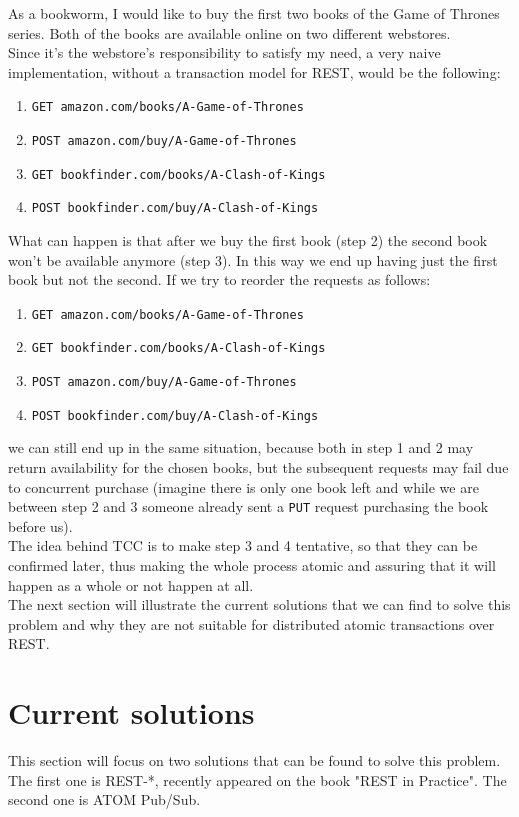 As a bookworm, I would like to buy the first two books of the Game of Thrones series. Both of the books are available online on two different webstores.\\
Since it's the webstore's responsibility to satisfy my need, a very naive implementation, without a transaction model for REST, would be the following:\\
\begin{enumerate}
\item {\tt GET amazon.com/books/A-Game-of-Thrones}
\item {\tt POST amazon.com/buy/A-Game-of-Thrones}
\item {\tt GET bookfinder.com/books/A-Clash-of-Kings}
\item {\tt POST bookfinder.com/buy/A-Clash-of-Kings}
\end{enumerate}
What can happen is that after we buy the first book (step 2) the second book won't be available anymore (step 3). In this way we end up having just the first book but not the second. If we try to reorder the requests as follows:
\begin{enumerate}
\item {\tt GET amazon.com/books/A-Game-of-Thrones}
\item {\tt GET bookfinder.com/books/A-Clash-of-Kings}
\item {\tt POST amazon.com/buy/A-Game-of-Thrones}
\item {\tt POST bookfinder.com/buy/A-Clash-of-Kings}
\end{enumerate}
we can still end up in the same situation, because both in step 1 and 2 may return availability for the chosen books, but the subsequent requests may fail due to concurrent purchase (imagine there is only one book left and while we are between step 2 and 3 someone already sent a {\tt PUT} request purchasing the book before us).\\
The idea behind TCC is to make step 3 and 4 tentative, so that they can be confirmed later, thus making the whole process atomic and assuring that it will happen as a whole or not happen at all.\\
The next section will illustrate the current solutions that we can find to solve this problem and why they are not suitable for distributed atomic transactions over REST.

\section{Current solutions}
This section will focus on two solutions that can be found to solve this problem. The first one is REST-*, recently appeared on the book "REST in Practice". The second one is ATOM Pub/Sub.

